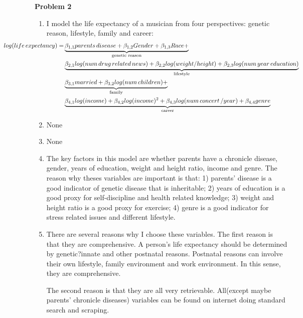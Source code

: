 \documentclass[letterpaper,12pt]{article}
\theoremstyle{definition}
\numberwithin{equation}{section}
\begin{document}
\noindent \textbf{\large Problem 2}\par
\begin{enumerate}  [\bfseries (a)]
	\item I model the life expectancy of a musician from four perspectives: genetic reason, lifestyle, family and career:\\
	\begin{align}
	\begin{split}
	\hspace*{-2.5cm} log(life\, expectancy) =& \underbrace{\beta_{1, 1}parents\,disease+ \beta_{1, 2}Gender + \beta_{1, 3} Race + }_\text{genetic reason}\\
	& \underbrace{\beta_{2, 1}log(num\,drug\,related\,news) + \beta_{2, 2} log(weight / height) + \beta_{2, 3}log(num\,year\,education) }_\text{lifestyle}\\
	& \underbrace{\beta_{3,1}married + \beta_{3 ,2}log(num\,children) + }_\text{family}\\
	& \underbrace{\beta_{4, 1} log(income) + \beta_{4, 2}log(income)^2 + \beta_{4, 3} log(num\, concert\, /year) + \beta_{4 ,4}genre} _\text{career}
	\end{split}
	\end{align}
	\item \quad None
	\item \quad None
	\item The key factors in this model are whether parents have a chronicle disease, gender, years of education, weight and height ratio, income and genre. 
	The reason why theses variables are important is that: 1) parents' disease is a good indicator of genetic disease that is inheritable; 2) years of education is a good proxy for self-discipline and health related knowledge; 3) weight and height ratio is a good proxy for exercise; 4) genre is a good indicator for stress related issues and different lifestyle.
	\item There are several reasons why I choose these variables. The first reason is that they are comprehensive. A person's life expectancy should be determined by genetic?innate and other postnatal reasons. Postnatal reasons can involve their own lifestyle, family environment and work environment. In this sense, they are comprehensive.\par 
	The second reason is that they are all very retrievable. All(except maybe parents' chronicle diseases) variables can be found on internet doing standard search and scraping. \par

\end{enumerate}
\end{document}
